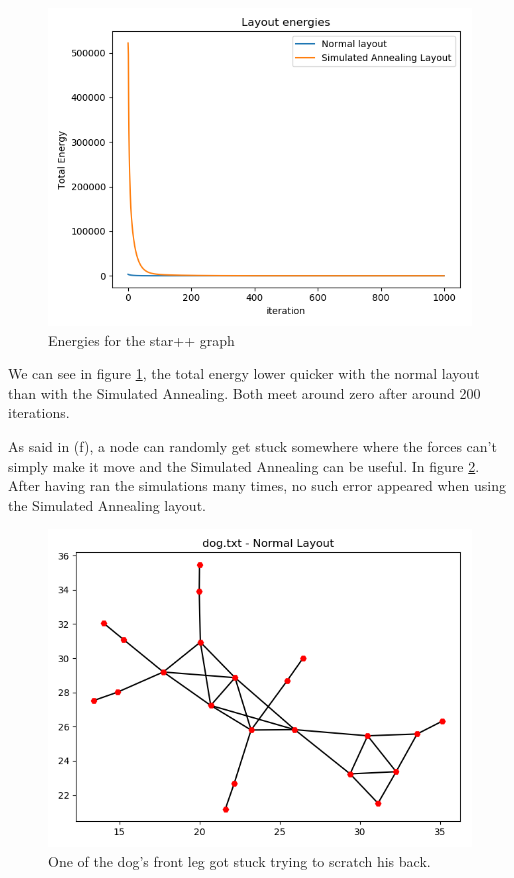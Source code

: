 \documentclass[10pt,a4paper]{article}
\begin{document}
\begin{enumerate}
\begin{figure}[H]
	\centering
	\includegraphics[width=0.7\linewidth]{../Scripts/star++_energies}
	\caption{Energies for the star++ graph}
	\label{fig:starenergies}
\end{figure}

We can see in figure \ref{fig:starenergies}, the total energy lower quicker with the normal layout than with the Simulated Annealing. Both meet around zero after around 200 iterations. 


As said in (f), a node can randomly get stuck somewhere where the forces can't simply make it move and the Simulated Annealing can be useful. In figure \ref{fig:dognormalerror}. After having ran the simulations many times, no such error appeared when using the Simulated Annealing layout. 

\begin{figure}[H]
	\centering
	\includegraphics[width=0.7\linewidth]{../Scripts/dog_normal_error}
	\caption{One of the dog's front leg got stuck trying to scratch his back. }
	\label{fig:dognormalerror}
\end{figure}



\end{enumerate}
\end{document}
